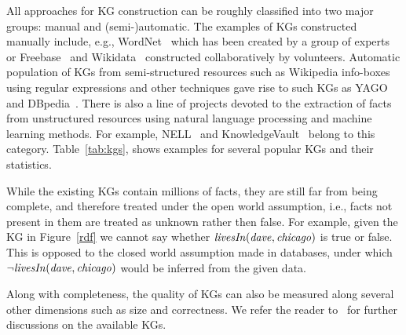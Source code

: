 
All approaches for KG construction can be roughly classified into two major groups: manual and (semi-)automatic. The examples of KGs constructed manually include, e.g., WordNet~\cite{wordnet} which has been created by a group of experts or Freebase~\cite{Freebase} and Wikidata~\cite{wikidata} constructed collaboratively by volunteers. 
Automatic population of KGs from semi-structured resources such as Wikipedia info-boxes using regular expressions and other techniques gave rise to such KGs as YAGO~\cite{yago} and DBpedia~\cite{dbpedia}. %
There is also a line of projects %
devoted to the extraction of facts from unstructured resources using natural language processing and machine learning methods. %
For example, NELL~\cite{nell} and KnowledgeVault~\cite{KnowledgeVault} belong to this category. Table~\ref{tab:kgs}, shows examples for several popular KGs and their statistics. %


While the existing KGs contain millions of facts, they are still far from being complete, and therefore treated under the open world assumption, i.e., facts not present in them are treated as unknown rather then false. For example, given the KG in Figure~\ref{rdf} we cannot say whether $\mathit{livesIn(dave,chicago)}$ is true or false. This is opposed to the closed world assumption made in databases, under which $\mathit{\neg livesIn(dave,chicago)}$ would be inferred from the given data.

Along with completeness, the quality of KGs can also be %
measured along several other dimensions such as size and correctness.  We refer the reader to~\cite{Nickel2015ARO,DBLP:journals/semweb/Paulheim17} for further discussions on the available KGs.




